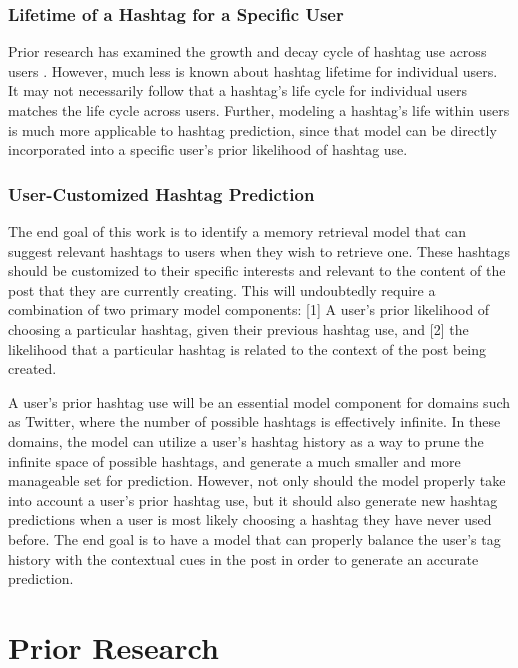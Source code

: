 \documentclass[man,floatsintext,donotrepeattitle]{apa6}
\begin{document}
\subsubsection{Lifetime of a Hashtag for a Specific User}

Prior research has examined the growth and decay cycle of hashtag use across users \parencite{Tsur2012}.
However, much less is known about hashtag lifetime for individual users.
It may not necessarily follow that a hashtag's life cycle for individual users matches the life cycle across users.
Further, modeling a hashtag's life within users is much more applicable to hashtag prediction, since that model can be directly incorporated into a specific user's prior likelihood of hashtag use.

\subsubsection{User-Customized Hashtag Prediction}

The end goal of this work is to identify a memory retrieval model that can suggest relevant hashtags to users when they wish to retrieve one.
These hashtags should be customized to their specific interests and relevant to the content of the post that they are currently creating.
This will undoubtedly require a combination of two primary model components:
[1] A user's prior likelihood of choosing a particular hashtag, given their previous hashtag use, and [2] the likelihood that a particular hashtag is related to the context of the post being created. 

A user's prior hashtag use will be an essential model component for domains such as Twitter, where the number of possible hashtags is effectively infinite.
In these domains, the model can utilize a user's hashtag history as a way to prune the infinite space of possible hashtags, and generate a much smaller and more manageable set for prediction.
However, not only should the model properly take into account a user's prior hashtag use, but it should also generate new hashtag predictions when a user is most likely choosing a hashtag they have never used before.
The end goal is to have a model that can properly balance the user's tag history with the contextual cues in the post in order to generate an accurate prediction.

\section{Prior Research}
\end{document}
